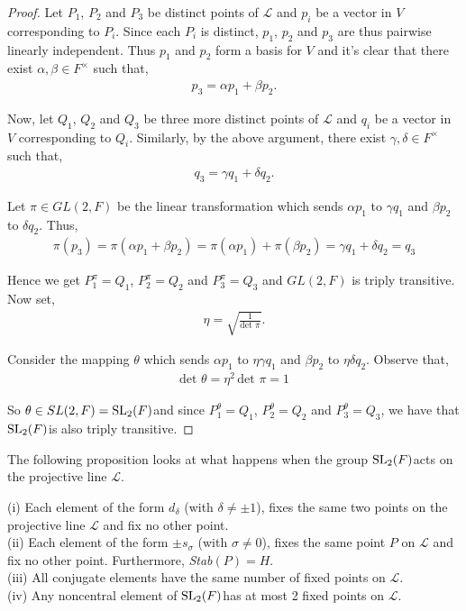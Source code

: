 \begin{proof} Let $P_1$, $P_2$ and $P_3$ be distinct points of $\mathscr{L}$ and $p_i$ be a vector in $V$ corresponding to $P_i$. Since each $P_i$ is distinct, $p_1$, $p_2$ and $p_3$ are thus pairwise linearly independent. Thus $p_1$ and $p_2$  form a basis for $V$ and it's clear that there exist $\alpha, \beta \in F^\times$ such that,
\begin{align*} p_3 = \alpha p_1 + \beta p_2.
\end{align*}

Now, let $Q_1$, $Q_2$ and $Q_3$ be three more distinct points of $\mathscr{L}$ and $q_i$ be a vector in $V$ corresponding to $Q_i$. Similarly, by the above argument, there exist $\gamma, \delta \in F^\times$ such that,
\begin{align*} q_3 = \gamma q_1 + \delta q_2.
\end{align*}

Let $\pi \in GL(2,F)$ be the linear transformation which sends $\alpha p_1$ to $\gamma q_1$  and $\beta p_2$ to $\delta q_2$. Thus,
\begin{align*} \pi(p_3) = \pi(\alpha p_1 + \beta p_2) = \pi(\alpha p_1) + \pi(\beta p_2) = \gamma q_1 + \delta q_2 = q_3 
\end{align*}

Hence we get $P^\pi_1 = Q_1$, $P^\pi_2 = Q_2$ and $P^\pi_3 = Q_3$ and $GL(2,F)$ is triply transitive. Now set,
\begin{align*} \eta = \sqrt{\frac{1}{\text{det }\pi}}.
\end{align*}

Consider the mapping $\theta$ which sends $\alpha p_1$ to $\eta \gamma q_1$ and $\beta p_2$ to $\eta \delta q_2$. Observe that,
\begin{align*} \text{det }\theta = \eta^2 \, \text{det } \pi = 1
\end{align*}

So $\theta \in SL(2,F) = \operatorname{SL}_2(F)$and since $P^\theta_1 = Q_1$, $P^\theta_2 = Q_2$ and $P^\theta_3 = Q_3$, we have that $\operatorname{SL}_2(F)$is also triply transitive. 

\end{proof}

The following proposition looks at what happens when the group $\operatorname{SL}_2(F)$acts on the projective line $\mathscr{L}$.

\begin{proposition} \label{6.7} (i) Each element of the form $d_\delta$ (with $\delta \neq \pm 1$), fixes the same two points on the projective line $\mathscr{L}$ and fix no other point. \vspace{3mm} \\
(ii) Each element of the form $\pm s_\sigma$ (with $\sigma \neq 0$), fixes the same point $P$ on $\mathscr{L}$ and fix no other point. Furthermore, \emph{Stab}$(P) = H$. \vspace{3mm} \\
(iii) All conjugate elements have the same number of fixed points on $\mathscr{L}$. \vspace{3mm} \\
(iv) Any noncentral element of $\operatorname{SL}_2(F)$has at most 2 fixed points on $\mathscr{L}$.
\end{proposition}

